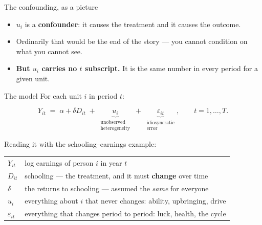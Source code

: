 \documentclass[
  11pt,
  ignorenonframetext,
  aspectratio=169,
]{beamer}
\providecommand{\tightlist}{%
  \setlength{\itemsep}{0pt}\setlength{\parskip}{0pt}}
\begin{document}
\begin{frame}{The confounding, as a picture}
\protect{}\label{the-confounding-as-a-picture}
\begin{center}
\end{center}

\vspace{-0.3em}

\begin{itemize}
\tightlist
\item
  \(u_i\) is a \textbf{confounder}: it causes the treatment and it
  causes the outcome.
\item
  Ordinarily that would be the end of the story --- you cannot condition
  on what you cannot see.
\item
  \textbf{But \(u_i\) carries no \(t\) subscript.} It is the same number
  in every period for a given unit.
\end{itemize}
\end{frame}

\begin{frame}{The model}
\protect{}\label{the-model}
For each unit \(i\) in period \(t\):

\[
Y_{it} \;=\; \alpha + \delta D_{it} \;+\; \underbrace{u_i}_{\substack{\text{unobserved} \\ \text{heterogeneity}}} \;+\; \underbrace{\varepsilon_{it}}_{\substack{\text{idiosyncratic} \\ \text{error}}}, \qquad t = 1, \dots, T .
\]

Reading it with the schooling--earnings example:

\begin{center}\small
\begin{tabular}{ll}
\toprule
$Y_{it}$ & log earnings of person $i$ in year $t$ \\
$D_{it}$ & schooling --- the treatment, and it must \textbf{change} over time \\
$\delta$ & the returns to schooling --- assumed the \emph{same} for everyone \\
$u_i$ & everything about $i$ that never changes: ability, upbringing, drive \\
$\varepsilon_{it}$ & everything that changes period to period: luck, health, the cycle \\
\bottomrule
\end{tabular}
\end{center}
\end{frame}
\end{document}
